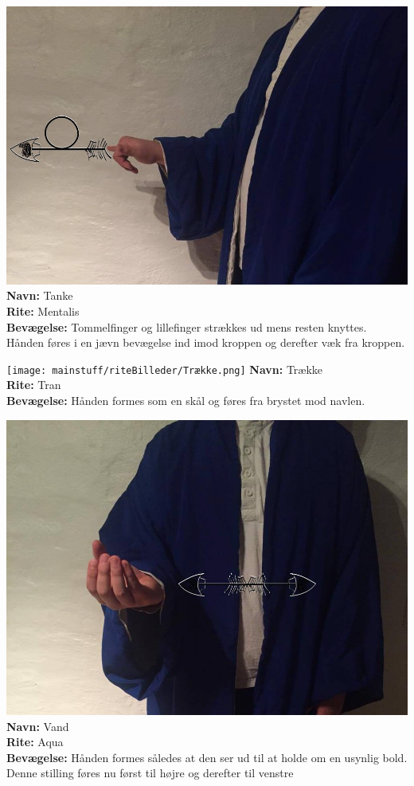 \begin{rite*}[Tanke]
    \centering
    \includegraphics[width=\textwidth]{mainstuff/riteBilleder/Tanke.png}
\Large \textbf{Navn:} Tanke\\
\textbf{Rite:} Mentalis\\
\textbf{Bevægelse:} Tommelfinger og lillefinger strækkes ud mens resten knyttes. Hånden føres i en jævn bevægelse ind imod kroppen og derefter væk fra kroppen.
\end{rite*}

\begin{rite*}[Trække]
    \centering
    \texttt{[image: mainstuff/riteBilleder/Trække.png]}
\Large \textbf{Navn:} Trække\\
\textbf{Rite:} Tran\\
\textbf{Bevægelse:} Hånden formes som en skål og føres fra brystet mod navlen.
\end{rite*}

\begin{rite*}[Vand]
    \centering
    \includegraphics[width=\textwidth]{mainstuff/riteBilleder/Vand.png}
\Large \textbf{Navn:} Vand\\
\textbf{Rite:} Aqua\\
\textbf{Bevægelse:} Hånden formes således at den ser ud til at holde om en usynlig bold. Denne stilling føres nu først til højre og derefter til venstre
\end{rite*}